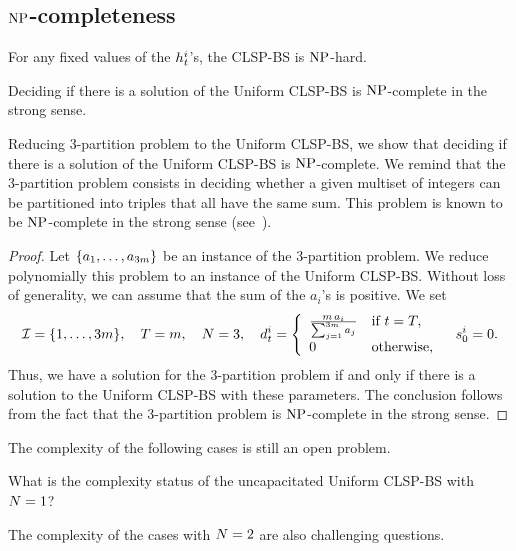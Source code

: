 \subsection{$\operatorname{NP}$-completeness}
\label{sec:PDP:deterministic:theoretical-results:NP-completeness}

For any fixed values of the $h_t^i$'s, the CLSP-BS is $\operatorname{NP}$-hard.

\begin{thm}
  Deciding if there is a solution of the Uniform CLSP-BS is $\operatorname{NP}$-complete in the strong sense.
\end{thm}



Reducing 3-partition problem to the Uniform CLSP-BS, we show that deciding if there is a solution of the Uniform CLSP-BS is $\operatorname{NP}$-complete.
We remind that the 3-partition problem consists in deciding whether a given multiset of integers can be partitioned into triples that all have the same sum.
This problem is known to be $\operatorname{NP}$-complete in the strong sense (see~\citet{Garey1979}).



\begin{proof}
Let $\crbracket{a_1,\ldots,a_{3m}}$ be an instance of the 3-partition problem.
We reduce polynomially this problem to an instance of the Uniform CLSP-BS.
Without loss of generality, we can assume that the sum of the $a_i$'s is positive.
We set
\begin{equation}
  \REF=\range[1]{3m}
  ,\quad
  \horizon=m
  ,\quad
  \nbsetups=3
  ,\quad
  \demand_t^i
  =\left\{
  \begin{array}{ll}
  \frac{m\,a_i}{\sum_{j=1}^{3m}a_j} & \mbox{if}\ t=\horizon,
  \\
  0 & \mbox{otherwise,}\end{array}
  \right.
  \quad
  \inventory_0^i=0.
\end{equation}
Thus, we have a solution for the 3-partition problem if and only if there is a solution to the Uniform CLSP-BS with these parameters.
The conclusion follows from the fact that the 3-partition problem is $\operatorname{NP}$-complete in the strong sense.
\end{proof}


The complexity of the following cases is still an open problem.
\begin{question}
What is the complexity status of the uncapacitated Uniform CLSP-BS with $N=1$?
\end{question}
The complexity of the cases with $N=2$ are also challenging questions.




